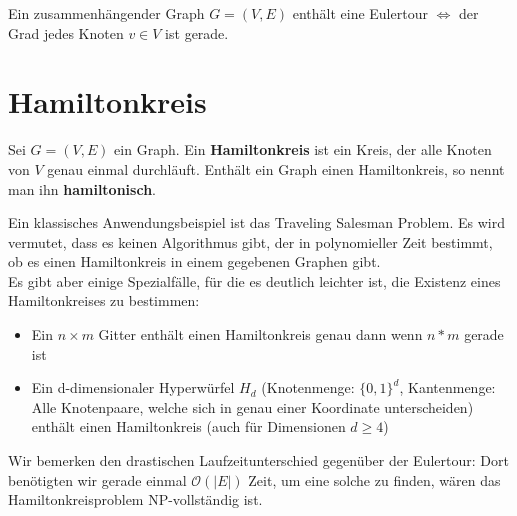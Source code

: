 \documentclass[a4paper]{report}
\begin{document}
\begin{satz}[Satz]
    Ein zusammenhängender Graph $G = (V,E)$ enthält eine Eulertour $\Leftrightarrow$ der Grad jedes Knoten
    $v \in V$ ist gerade.
\end{satz}

\section{Hamiltonkreis}
\begin{definition}
    Sei $G = (V,E)$ ein Graph. Ein \textbf{Hamiltonkreis} ist ein Kreis, der alle Knoten von $V$ genau einmal
    durchläuft. Enthält ein Graph einen Hamiltonkreis, so nennt man ihn \textbf{hamiltonisch}.
\end{definition}
\bigskip

Ein klassisches Anwendungsbeispiel ist das Traveling Salesman Problem. Es wird vermutet, dass es keinen 
Algorithmus gibt, der in polynomieller Zeit bestimmt, ob es einen Hamiltonkreis in einem gegebenen Graphen 
gibt. \\

Es gibt aber einige Spezialfälle, für die es deutlich leichter ist, die Existenz eines Hamiltonkreises 
zu bestimmen:

\begin{itemize}
    \item Ein $n \times m$ Gitter enthält einen Hamiltonkreis genau dann wenn $n * m$ gerade ist
    \item Ein d-dimensionaler Hyperwürfel $H_d$ (Knotenmenge: $\{0, 1\}^d$, Kantenmenge: Alle Knotenpaare, welche sich in genau einer Koordinate unterscheiden) enthält einen Hamiltonkreis (auch für Dimensionen $d \geq 4$)
\end{itemize}





Wir bemerken den drastischen Laufzeitunterschied gegenüber der Eulertour: Dort benötigten wir gerade 
einmal $\mathcal{O}(|E|)$ Zeit, um eine solche zu finden, wären das Hamiltonkreisproblem NP-vollständig ist.
\end{document}
